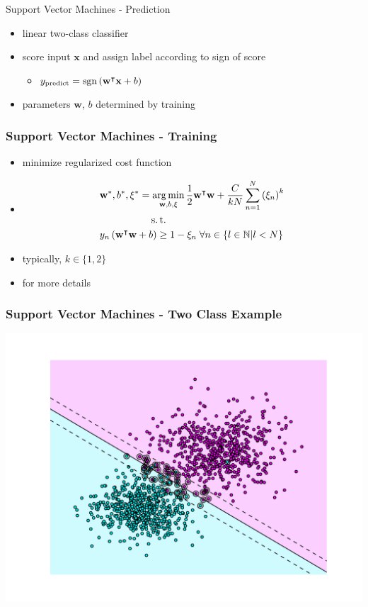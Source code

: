 \begin{frame}{Support Vector Machines - Prediction}
    \begin{itemize}
          \item linear two-class classifier
          \item score input $\textbf{x}$ and assign label according to sign of score
        \begin{itemize}
              \item[] $y_{\text{predict}} = \operatorname{sgn}\left(\textbf{w}^{\intercal}\textbf{x} + b\right)$
        \end{itemize}
          \item parameters $\textbf{w}$, $b$ determined by training
    \end{itemize}
\end{frame}


\begin{frame}
    \frametitle{Support Vector Machines - Training }
    \begin{itemize}
          \item minimize regularized cost function
          \item[] \begin{align}
            &\textbf{w}^*, b^*, \xi^*  = \argmin_{\textbf{w}, b, \xi} \frac{1}{2} \textbf{w}^{\intercal} \textbf{w}
            + \frac{C}{kN}\sum_{n=1}^N\left(\xi_n\right)^k \\
            &\phantom{\textbf{w}^*, b^*, \xi^*  = }\st \nonumber \\ 
            &y_n\left(\textbf{w}^\intercal\textbf{w}+b\right) \geq 1 - \xi_n \; \forall n \in \{l \in
            \mathbb{N} | l < N\}
        \end{align}
          \item typically, $k\in\{1,2\}$
        \item {} for more details
    \end{itemize}
\end{frame}


\begin{frame}
    \frametitle{Support Vector Machines - Two Class Example}
    \includegraphics[width=\textwidth]{images/two_class_svm.pdf}
\end{frame}


